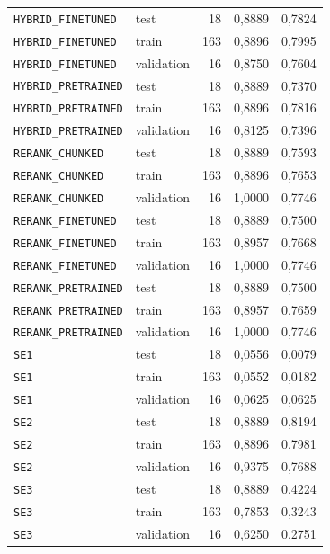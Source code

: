 \begin{longtable}{p{.34\linewidth}lrrr}
{\footnotesize\texttt{HYBRID\_FINETUNED}} & test & 18 & 0,8889 & 0,7824 \\
{\footnotesize\texttt{HYBRID\_FINETUNED}} & train & 163 & 0,8896 & 0,7995 \\
{\footnotesize\texttt{HYBRID\_FINETUNED}} & validation & 16 & 0,8750 & 0,7604 \\
{\footnotesize\texttt{HYBRID\_PRETRAINED}} & test & 18 & 0,8889 & 0,7370 \\
{\footnotesize\texttt{HYBRID\_PRETRAINED}} & train & 163 & 0,8896 & 0,7816 \\
{\footnotesize\texttt{HYBRID\_PRETRAINED}} & validation & 16 & 0,8125 & 0,7396 \\
{\footnotesize\texttt{RERANK\_CHUNKED}} & test & 18 & 0,8889 & 0,7593 \\
{\footnotesize\texttt{RERANK\_CHUNKED}} & train & 163 & 0,8896 & 0,7653 \\
{\footnotesize\texttt{RERANK\_CHUNKED}} & validation & 16 & 1,0000 & 0,7746 \\
{\footnotesize\texttt{RERANK\_FINETUNED}} & test & 18 & 0,8889 & 0,7500 \\
{\footnotesize\texttt{RERANK\_FINETUNED}} & train & 163 & 0,8957 & 0,7668 \\
{\footnotesize\texttt{RERANK\_FINETUNED}} & validation & 16 & 1,0000 & 0,7746 \\
{\footnotesize\texttt{RERANK\_PRETRAINED}} & test & 18 & 0,8889 & 0,7500 \\
{\footnotesize\texttt{RERANK\_PRETRAINED}} & train & 163 & 0,8957 & 0,7659 \\
{\footnotesize\texttt{RERANK\_PRETRAINED}} & validation & 16 & 1,0000 & 0,7746 \\
{\footnotesize\texttt{SE1}} & test & 18 & 0,0556 & 0,0079 \\
{\footnotesize\texttt{SE1}} & train & 163 & 0,0552 & 0,0182 \\
{\footnotesize\texttt{SE1}} & validation & 16 & 0,0625 & 0,0625 \\
{\footnotesize\texttt{SE2}} & test & 18 & 0,8889 & 0,8194 \\
{\footnotesize\texttt{SE2}} & train & 163 & 0,8896 & 0,7981 \\
{\footnotesize\texttt{SE2}} & validation & 16 & 0,9375 & 0,7688 \\
{\footnotesize\texttt{SE3}} & test & 18 & 0,8889 & 0,4224 \\
{\footnotesize\texttt{SE3}} & train & 163 & 0,7853 & 0,3243 \\
{\footnotesize\texttt{SE3}} & validation & 16 & 0,6250 & 0,2751 \\
\end{longtable}\endgroup
{}
